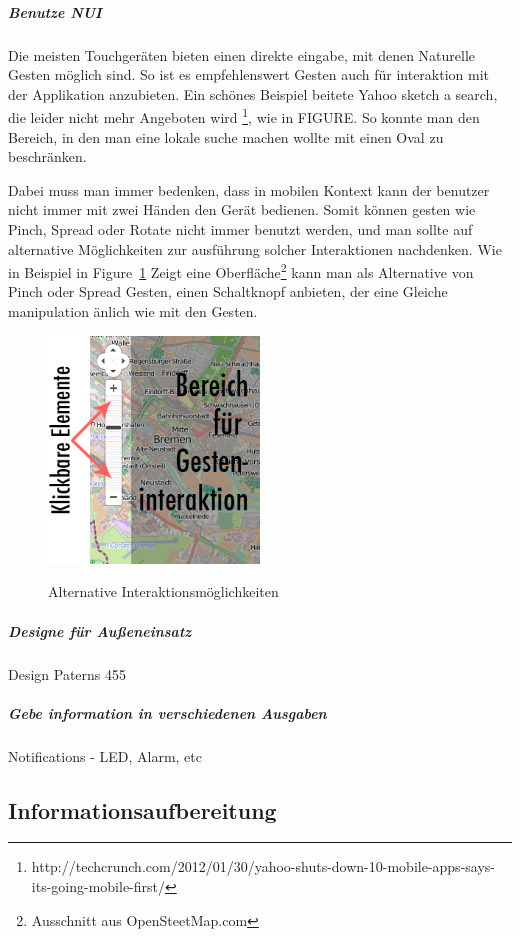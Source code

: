 \subparagraph{Benutze NUI} 
\label{subp:benutze_nui}

Die meisten Touchgeräten bieten einen direkte eingabe, mit denen Naturelle Gesten möglich sind. So ist es empfehlenswert Gesten auch für interaktion mit der Applikation anzubieten. Ein schönes Beispiel beitete Yahoo sketch a search, die leider nicht mehr Angeboten wird \footnote{http://techcrunch.com/2012/01/30/yahoo-shuts-down-10-mobile-apps-says-its-going-mobile-first/ }, wie in FIGURE. So konnte man den Bereich, in den man eine lokale suche machen wollte mit einen Oval zu beschränken.

Dabei muss man immer bedenken, dass in mobilen Kontext kann der benutzer nicht immer mit zwei Händen den Gerät bedienen. Somit können gesten wie Pinch, Spread oder Rotate nicht immer benutzt werden, und man sollte auf alternative Möglichkeiten zur ausführung solcher Interaktionen nachdenken. Wie in Beispiel in Figure~\ref{fig:nuibsp} Zeigt eine Oberfläche\footnote{Ausschnitt aus OpenSteetMap.com} kann man als Alternative von Pinch oder Spread Gesten, einen Schaltknopf anbieten, der eine Gleiche manipulation änlich wie mit den Gesten.

\begin{figure}[h]
	\caption{Alternative Interaktionsmöglichkeiten}
	\includegraphics[width=0.5\textwidth]{img/NUIbsp.png}
	\label{fig:nuibsp}
\end{figure}

\subparagraph{Designe für Außeneinsatz} %
\label{subp:designe_f_r_au_eneinsatz}

Design Paterns 455

\subparagraph{Gebe information in verschiedenen Ausgaben}
\label{subp:gebe_information_in_verschiedenen_ausgaben}

Notifications - LED, Alarm, etc

\subsection{Informationsaufbereitung}

